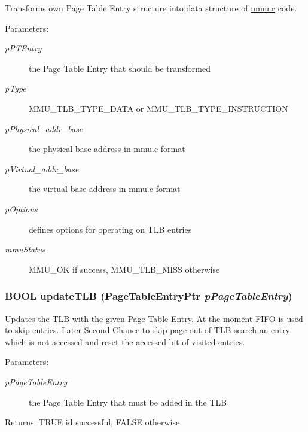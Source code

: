 Transforms own Page Table Entry structure into data structure of \hyperlink{mmu_8c}{mmu.c} code. \begin{Desc}
\item[Parameters:]
\begin{description}
\item[{\em pPTEntry}]the Page Table Entry that should be transformed \item[{\em pType}]MMU\_\-TLB\_\-TYPE\_\-DATA or MMU\_\-TLB\_\-TYPE\_\-INSTRUCTION \item[{\em pPhysical\_\-addr\_\-base}]the physical base address in \hyperlink{mmu_8c}{mmu.c} format \item[{\em pVirtual\_\-addr\_\-base}]the virtual base address in \hyperlink{mmu_8c}{mmu.c} format \item[{\em pOptions}]defines options for operating on TLB entries \item[{\em mmuStatus}]MMU\_\-OK if success, MMU\_\-TLB\_\-MISS otherwise \end{description}
\end{Desc}
\hypertarget{group___v_m_m___t_l_b_g769f3784ad4e3826035640f257947a48}{
\subsubsection[{updateTLB}]{\setlength{\rightskip}{0pt plus 5cm}BOOL updateTLB ({\bf PageTableEntryPtr} {\em pPageTableEntry})}}
\label{group___v_m_m___t_l_b_g769f3784ad4e3826035640f257947a48}


Updates the TLB with the given Page Table Entry. At the moment FIFO is used to skip entries. Later Second Chance to skip page out of TLB search an entry which is not accessed and reset the accessed bit of visited entries. \begin{Desc}
\item[Parameters:]
\begin{description}
\item[{\em pPageTableEntry}]the Page Table Entry that must be added in the TLB \end{description}
\end{Desc}
\begin{Desc}
\item[Returns:]TRUE id successful, FALSE otherwise \end{Desc}
